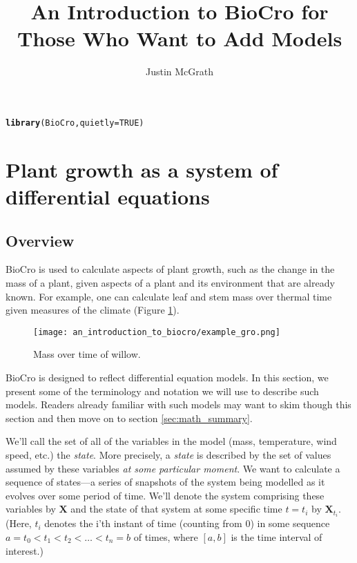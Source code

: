 \documentclass{article}\usepackage[]{graphicx}\usepackage[]{color}
\title{An Introduction to BioCro for Those Who Want to Add Models}
\author{Justin McGrath}
\makeatletter
\newcommand{\hlnum}[1]{\textcolor[rgb]{0.686,0.059,0.569}{#1}}%
\newcommand{\hlstd}[1]{\textcolor[rgb]{0.345,0.345,0.345}{#1}}%
\newcommand{\hlkwc}[1]{\textcolor[rgb]{0.333,0.667,0.333}{#1}}%
\newcommand{\hlkwd}[1]{\textcolor[rgb]{0.737,0.353,0.396}{\textbf{#1}}}%
\newenvironment{kframe}{%
 \def\at@end@of@kframe{}%
 \ifinner\ifhmode%
  \def\at@end@of@kframe{\end{minipage}}%
  \begin{minipage}{\columnwidth}%
 \fi\fi%
 \def\FrameCommand##1{\hskip\@totalleftmargin \hskip-\fboxsep
 \colorbox{shadecolor}{##1}\hskip-\fboxsep
     \hskip-\linewidth \hskip-\@totalleftmargin \hskip\columnwidth}%
 \MakeFramed {\advance\hsize-\width
   \@totalleftmargin\z@ \linewidth\hsize
   \@setminipage}}%
 {\par\unskip\endMakeFramed%
 \at@end@of@kframe}
\newenvironment{knitrout}{}{} %
\newcommand{\boldX}{\mathbf{X}}
\makeatother
\begin{document}
\maketitle

\tableofcontents


\begin{knitrout}
\color{fgcolor}\begin{kframe}
\begin{alltt}
\hlkwd{library}\hlstd{(BioCro,} \hlkwc{quietly}\hlstd{=}\hlnum{TRUE}\hlstd{)}
\end{alltt}
\end{kframe}
\end{knitrout}

\section{Plant growth as a system of differential equations}
\subsection{Overview}

BioCro is used to calculate aspects of plant growth, such as the
change in the mass of a plant, given aspects of a plant and its
environment that are already known. For example, one can calculate
leaf and stem mass over thermal time given measures of the climate
(Figure \ref{fig:example}).

\begin{figure}[!h]
\centering
\texttt{[image: an\_introduction\_to\_biocro/example\_gro.png]}
\caption{\label{fig:example}Mass over time of willow.}
\end{figure}

BioCro is designed to reflect differential equation models. In this
section, we present some of the terminology and notation we will use
to describe such models.  Readers already familiar with such models
may want to skim though this section and then move on to section
\ref{sec:math_summary}.

We'll call the set of all of the variables in the model (mass,
temperature, wind speed, etc.) the \emph{state}. More precisely, a
\emph{state} is described by the set of values assumed by these
variables \emph{at some particular moment}.  We want to calculate a
sequence of states---a series of snapshots of the system being modelled
as it evolves over some period of time.  We'll denote the system
comprising these variables by $\boldX$ and the state of that system at
some specific time $t = t_i$ by $\boldX_{t_i}$.  (Here, $t_i$ denotes
the i'th instant of time (counting from 0) in some sequence $a = t_0 <
t_1 < t_2 < \dots < t_n = b$ of times, where $[a, b]$ is the time
interval of interest.)
\end{document}
